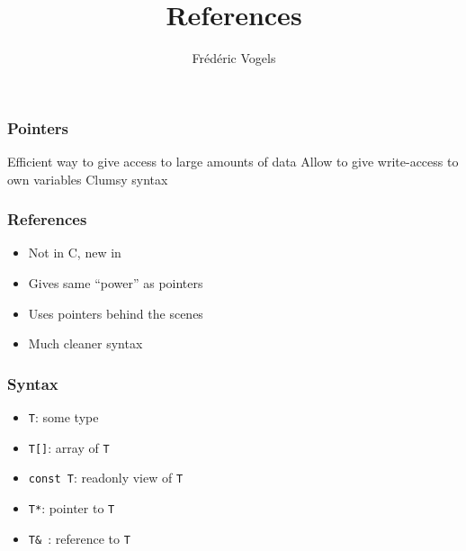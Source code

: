 \usepackage{ucll-code}
\usetikzlibrary{shadows,shapes.multipart}

\title{References}
\author{Fr\'ed\'eric Vogels}

\newcommand{\highlightbox}[2][]{
  \draw[opacity=.75,ultra thick,red,#1] ($ (#2.south west) + (-.1,-.1) $) rectangle ($ (#2.north east) + (.1,.1) $)
}




\begin{frame}
  \titlepage
\end{frame}

\begin{frame}
  \frametitle{Pointers}
  \begin{procontralist}
    \pro Efficient way to give access to large amounts of data
    \pro Allow to give write-access to own variables
    \con Clumsy syntax
  \end{procontralist}
  \vskip5mm
\end{frame}

\begin{frame}
  \frametitle{References}
  \begin{itemize}
    \item Not in C, new in \cpp
    \item Gives same ``power'' as pointers
    \item Uses pointers behind the scenes
    \item Much cleaner syntax
  \end{itemize}
\end{frame}

\begin{frame}
  \frametitle{Syntax}
  \begin{itemize}
    \item {\tt T}: some type
    \item {\tt T[]}: array of {\tt T}
    \item {\tt const T}: readonly view of {\tt T}
    \item {\tt T*}: pointer to {\tt T}
    \item<2-> {\tt T\& }: reference to {\tt T}
  \end{itemize}
\end{frame}

